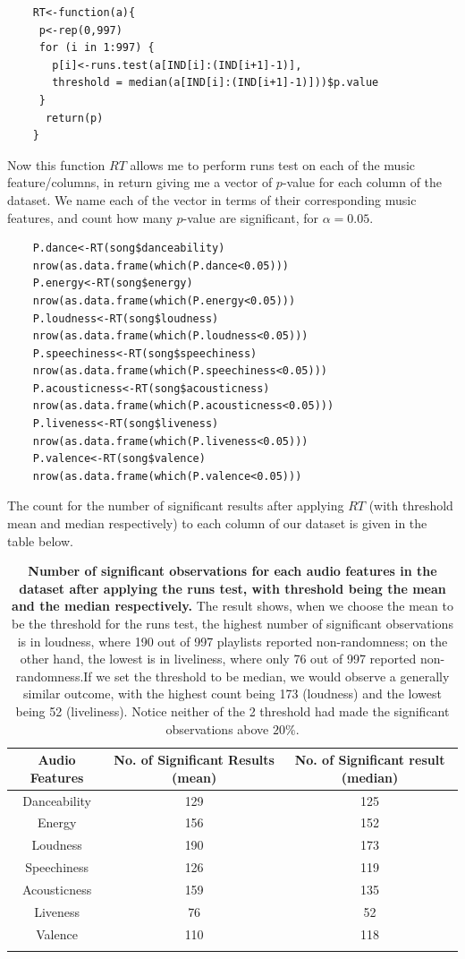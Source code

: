 \documentclass[12pt]{article}
\theoremstyle{plain}
\theoremstyle{definition}
\theoremstyle{remark}
\begin{document}
\begin{verbatim}
    RT<-function(a){
     p<-rep(0,997)
     for (i in 1:997) {
       p[i]<-runs.test(a[IND[i]:(IND[i+1]-1)],
       threshold = median(a[IND[i]:(IND[i+1]-1)]))$p.value
     }
      return(p)
    }
\end{verbatim}
Now this function $RT$ allows me to perform runs test on each of the music feature/columns, in return giving me a vector of $p$-value for each column of the dataset. We name each of the vector in terms of their corresponding music features, and count how many $p$-value are significant, for $\alpha=0.05$.
\begin{verbatim}
    P.dance<-RT(song$danceability)
    nrow(as.data.frame(which(P.dance<0.05)))
    P.energy<-RT(song$energy)
    nrow(as.data.frame(which(P.energy<0.05)))
    P.loudness<-RT(song$loudness)
    nrow(as.data.frame(which(P.loudness<0.05)))
    P.speechiness<-RT(song$speechiness)
    nrow(as.data.frame(which(P.speechiness<0.05)))
    P.acousticness<-RT(song$acousticness)
    nrow(as.data.frame(which(P.acousticness<0.05)))
    P.liveness<-RT(song$liveness)
    nrow(as.data.frame(which(P.liveness<0.05)))
    P.valence<-RT(song$valence)
    nrow(as.data.frame(which(P.valence<0.05)))
\end{verbatim}

The count for the number of significant results after applying $RT$ (with threshold mean and median respectively) to each column of our dataset is given in the table below.
\begin{longtable}{|c|c|c|}
    \hline
     Audio Features & No. of Significant Results (mean) & No. of Significant result (median) \\
    \hline
     Danceability &129&125\\
     \hline
     Energy &156&152\\
     \hline
     Loudness &190&173\\
     \hline
     Speechiness &126&119\\
     \hline
     Acousticness &159&135\\
     \hline
     Liveness &76&52\\
     \hline
     Valence &110&118\\
    \hline
  \caption{\textbf{Number of significant observations for each audio features in the dataset after applying the runs test, with threshold being the mean and the median respectively.} The result shows, when we choose the mean to be the threshold for the runs test, the highest number of significant observations is in loudness, where 190 out of 997 playlists reported non-randomness; on the other hand, the lowest is in liveliness, where only 76 out of 997 reported non-randomness.If we set the threshold to be median, we would observe a generally similar outcome, with the highest count being 173 (loudness) and the lowest being 52 (liveliness). Notice neither of the 2 threshold had made the significant observations above $20\%$.}
  \label{table 1}
\end{longtable}
\end{document}
